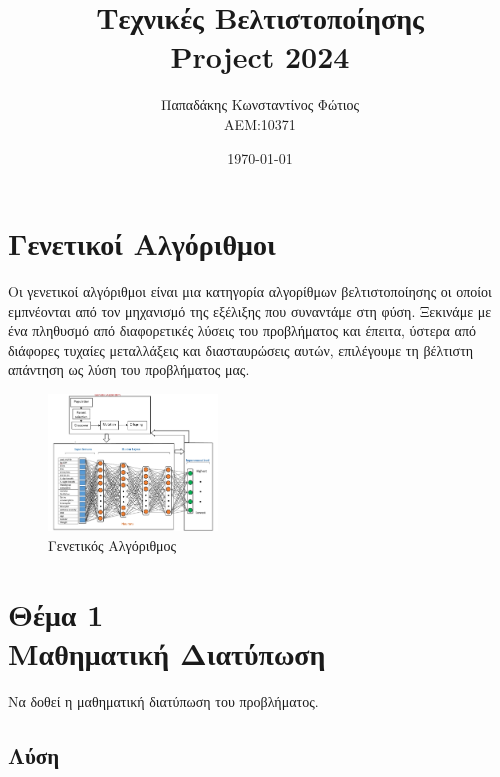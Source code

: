 \documentclass[twocolumn]{report}
\begin{document}

\title{\Huge \bfseries Τεχνικές Βελτιστοποίησης \\ Project 2024} %
\author{Παπαδάκης Κωνσταντίνος Φώτιος\vspace{0.5cm} \\  ΑΕΜ:10371} %
\date{\today}
\maketitle

\section*{Γενετικοί Αλγόριθμοι}
Οι γενετικοί αλγόριθμοι είναι μια κατηγορία αλγορίθμων βελτιστοποίησης οι
οποίοι εμπνέονται από τον μηχανισμό της εξέλιξης που συναντάμε στη φύση.
Ξεκινάμε με ένα πληθυσμό από διαφορετικές λύσεις του προβλήματος και έπειτα, 
ύστερα από διάφορες τυχαίες μεταλλάξεις και διασταυρώσεις αυτών, επιλέγουμε 
τη βέλτιστη απάντηση ως λύση του προβλήματος μας.
\begin{figure}[H]
    \centering
    \includegraphics[width=0.4\textwidth]{media/genetic_algorithm.png}
    \caption{Γενετικός Αλγόριθμος}
\end{figure}

\section*{Θέμα 1\\Μαθηματική Διατύπωση}
Να δοθεί η μαθηματική διατύπωση του προβλήματος.
\subsection*{Λύση}
\end{document}
